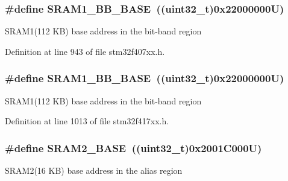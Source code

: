 \subsubsection[{\texorpdfstring{S\+R\+A\+M1\+\_\+\+B\+B\+\_\+\+B\+A\+SE}{SRAM1_BB_BASE}}]{\setlength{\rightskip}{0pt plus 5cm}\#define S\+R\+A\+M1\+\_\+\+B\+B\+\_\+\+B\+A\+SE~((uint32\+\_\+t)0x22000000\+U)}\hypertarget{group___peripheral__registers__structures_gac4c4f61082e4b168f29d9cf97dc3ca5c}{}\label{group___peripheral__registers__structures_gac4c4f61082e4b168f29d9cf97dc3ca5c}
S\+R\+A\+M1(112 K\+B) base address in the bit-\/band region 

Definition at line 943 of file stm32f407xx.\+h.

\subsubsection[{\texorpdfstring{S\+R\+A\+M1\+\_\+\+B\+B\+\_\+\+B\+A\+SE}{SRAM1_BB_BASE}}]{\setlength{\rightskip}{0pt plus 5cm}\#define S\+R\+A\+M1\+\_\+\+B\+B\+\_\+\+B\+A\+SE~((uint32\+\_\+t)0x22000000\+U)}\hypertarget{group___peripheral__registers__structures_gac4c4f61082e4b168f29d9cf97dc3ca5c}{}\label{group___peripheral__registers__structures_gac4c4f61082e4b168f29d9cf97dc3ca5c}
S\+R\+A\+M1(112 K\+B) base address in the bit-\/band region 

Definition at line 1013 of file stm32f417xx.\+h.

\subsubsection[{\texorpdfstring{S\+R\+A\+M2\+\_\+\+B\+A\+SE}{SRAM2_BASE}}]{\setlength{\rightskip}{0pt plus 5cm}\#define S\+R\+A\+M2\+\_\+\+B\+A\+SE~((uint32\+\_\+t)0x2001\+C000\+U)}\hypertarget{group___peripheral__registers__structures_gadbb42a3d0a8a90a79d2146e4014241b1}{}\label{group___peripheral__registers__structures_gadbb42a3d0a8a90a79d2146e4014241b1}
S\+R\+A\+M2(16 K\+B) base address in the alias region 

